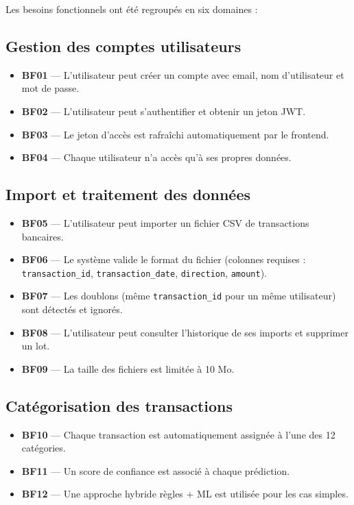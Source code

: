 \documentclass[12pt,a4paper]{report}
\begin{document}
Les besoins fonctionnels ont été regroupés en six domaines :

\subsection{Gestion des comptes utilisateurs}
\begin{itemize}[noitemsep]
  \item \textbf{BF01} — L'utilisateur peut créer un compte avec email, nom d'utilisateur et mot de passe.
  \item \textbf{BF02} — L'utilisateur peut s'authentifier et obtenir un jeton JWT.
  \item \textbf{BF03} — Le jeton d'accès est rafraîchi automatiquement par le frontend.
  \item \textbf{BF04} — Chaque utilisateur n'a accès qu'à ses propres données.
\end{itemize}

\subsection{Import et traitement des données}
\begin{itemize}[noitemsep]
  \item \textbf{BF05} — L'utilisateur peut importer un fichier CSV de transactions bancaires.
  \item \textbf{BF06} — Le système valide le format du fichier (colonnes requises : \texttt{transaction\_id}, \texttt{transaction\_date}, \texttt{direction}, \texttt{amount}).
  \item \textbf{BF07} — Les doublons (même \texttt{transaction\_id} pour un même utilisateur) sont détectés et ignorés.
  \item \textbf{BF08} — L'utilisateur peut consulter l'historique de ses imports et supprimer un lot.
  \item \textbf{BF09} — La taille des fichiers est limitée à 10 Mo.
\end{itemize}

\subsection{Catégorisation des transactions}
\begin{itemize}[noitemsep]
  \item \textbf{BF10} — Chaque transaction est automatiquement assignée à l'une des 12 catégories.
  \item \textbf{BF11} — Un score de confiance est associé à chaque prédiction.
  \item \textbf{BF12} — Une approche hybride règles + ML est utilisée pour les cas simples.
\end{itemize}
\end{document}
